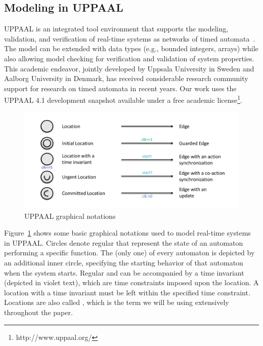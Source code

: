 \subsection{Modeling in UPPAAL}
\label{sub: modeling_in_uppaal}
UPPAAL is an integrated tool environment that supports the modeling, validation, and verification of real-time systems as networks of timed automata~\cite{behrmann2004_Tutorial_UPPAAL}. The model can be extended with data types (e.g., bounded integers, arrays) while also allowing model checking for verification and validation of system properties. This academic endeavor, jointly developed by Uppsala University in Sweden and Aalborg University in Denmark, has received considerable research community support for research on timed automata in recent years. Our work uses the UPPAAL 4.1 development snapshot available under a free academic license\footnote{http://www.uppaal.org/}.
\par
\begin{figure}[h!]
    \centering
    \includegraphics[width=\linewidth]{Figures/UPPAAL_Notations.pdf}
    \caption{UPPAAL graphical notations}
    \label{fig:uppaal_graphical_notations}
\end{figure}
\par
Figure~\ref{fig:uppaal_graphical_notations} shows some basic graphical notations used to model real-time systems in UPPAAL. Circles denote regular  that represent the state of an automaton performing a specific function. The  (only one) of every automaton is depicted by an additional inner circle, specifying the starting behavior of that automaton when the system starts. Regular and  can be accompanied by a time invariant (depicted in violet text), which are time constraints imposed upon the location. A location with a time invariant must be left within the specified time constraint. Locations are also called , which is the term we will be using extensively throughout the paper.
